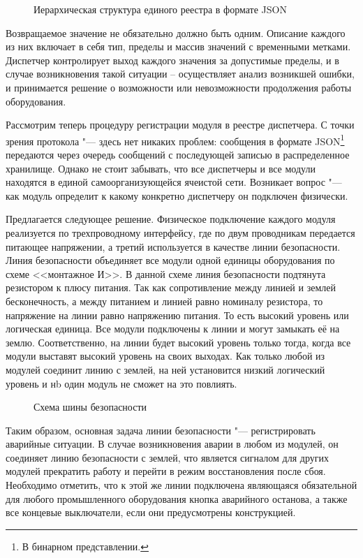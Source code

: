 \begin{figure}[ht]
\caption{Иерархическая структура единого реестра в формате JSON}\label{fig:json}
\end{figure}

Возвращаемое значение не обязательно должно быть одним. Описание каждого из них включает в себя тип, пределы и массив значений с временными метками. Диспетчер контролирует выход каждого значения за допустимые пределы, и в случае возникновения такой ситуации – осуществляет анализ возникшей ошибки, и принимается решение о возможности или невозможности продолжения работы оборудования.

Рассмотрим теперь процедуру регистрации модуля в реестре диспетчера. С точки зрения протокола "--- здесь нет никаких проблем: сообщения в формате JSON\footnote{В бинарном представлении.} передаются через очередь сообщений с последующей записью в распределенное хранилище. Однако не стоит забывать, что все диспетчеры и все модули находятся в единой самоорганизующейся ячеистой сети. Возникает вопрос "--- как модуль определит к какому конкретно диспетчеру он подключен физически.

Предлагается следующее решение. Физическое подключение каждого модуля реализуется по трехпроводному интерфейсу, где по двум проводникам передается питающее напряжении, а третий используется в качестве линии безопасности. Линия безопасности объединяет все модули одной единицы оборудования по схеме <<монтажное И>>. В данной схеме линия безопасности подтянута резистором к плюсу питания. Так как сопротивление между линией и землей бесконечность, а между питанием и линией равно номиналу резистора, то напряжение на линии равно напряжению питания. То есть высокий уровень или логическая единица. Все модули подключены к линии и могут замыкать её на землю. Соответственно, на линии будет высокий уровень только тогда, когда все модули выставят высокий уровень на своих выходах. Как только любой из модулей соединит линию с землей, на ней установится низкий логический уровень и нb один модуль не сможет на это повлиять.

\begin{figure}[ht]
\caption{Схема шины безопасности}\label{fig:logic-and}
\end{figure}

Таким образом, основная задача линии безопасности "--- регистрировать аварийные ситуации. В случае возникновения аварии в любом из модулей, он соединяет линию безопасности с землей, что является сигналом для других модулей прекратить работу и перейти в режим восстановления после сбоя. Необходимо отметить, что к этой же линии подключена являющаяся обязательной для любого промышленного оборудования кнопка аварийного останова, а также все концевые выключатели, если они предусмотрены конструкцией.

